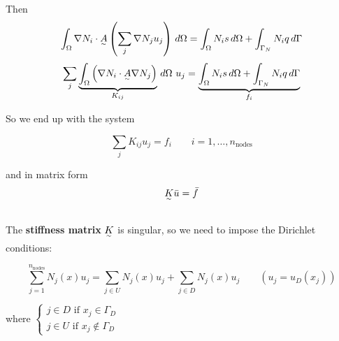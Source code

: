 Then 
\[
  \int_\Omega \nabla N_i \cdot \underset{^\sim}{A}\left(\sum_j\nabla N_ju_j\right)\,d\Omega = \int_\Omega N_is\,d\Omega + \int_{\Gamma_N}N_iq\,d\Gamma
\]
\[
  \sum_j\underbrace{\int_\Omega\left(\nabla N_i\cdot\underset{^\sim}{A}\nabla N_j\right)}_{K_{ij}}\,d\Omega \,\, u_j = \underbrace{\int_\Omega N_is\,d\Omega + \int_{\Gamma_N}N_iq\,d\Gamma}_{f_i}
\]

So we end up with the system

\[
  \sum_jK_{ij}u_j = f_i \qquad i=1,\ldots,n_{\text{nodes}}
\]

and in matrix form
\[
  \underset{^\sim}{K}\Bar{u} = \bar{f}
\]\-\\
The \textbf{stiffness matrix} $\underset{^\sim}{K}$ is singular, so we need to impose the Dirichlet conditions:

\[
  \sum_{j=1}^{n_{\text{nodes}}} N_j(x)u_j = \sum_{j\in U}N_j(x)u_j + \sum_{j\in D}N_j(x)u_j \qquad (u_j=u_D(x_j))
\]

where $\begin{cases}
    j\in D \text{ if } x_j \in \Gamma_D\\ j\in U \text{ if } x_j\not\in \Gamma_D
\end{cases}$

\newpage

